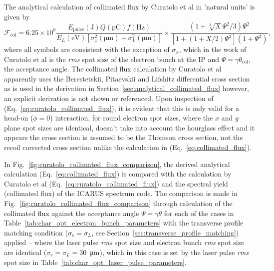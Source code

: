 \documentclass[../main.tex]{subfiles}
\begin{document}
The analytical calculation of collimated flux by Curatolo et al \cite{curatolo2017analytical} in 'natural units' is given by  
\begin{equation}
\mathcal{F}_{\mathrm{col}} = 6.25\times 10^{8}\frac{E_{\mathrm{pulse}}\left(\mathrm{\si{\joule}}\right)Q\left(\si{\pico\coulomb}\right)f\left(\si{\hertz}\right)}{E_{L}\left(\si{\electronvolt}\right)\left[\sigma_{x}^{2}\left(\si{\micro\meter}\right)+\sigma_{L}^{2}\left(\si{\micro\meter}\right)\right]}\times\frac{\left(1+\sqrt[3]{X}\Psi^{2}/3\right)\Psi^{2}}{\left[1+\left(1+X/2\right)\Psi^{2}\right]\left(1+\Psi^{2}\right)},
\label{eq:curatolo_collimated_flux}
\end{equation}
where all symbols are consistent with the exception of $\sigma_{x}$, which in the work of Curatolo et al is the \textit{rms} spot size of the electron bunch at the IP and $\Psi = \gamma\theta_{\mathrm{col}}$, the acceptance angle. The collimated flux calculation by Curatolo et al \cite{curatolo2017analytical} apparently uses the Berestetskii, Pitaevskii and Lifshitz \cite{berestetskii1982quantum} differential cross section as is used in the derivation in Section~\ref{sec:analytical_collimated_flux} however, an explicit derivation is not shown or referenced. Upon inspection of (Eq.~\ref{eq:curatolo_collimated_flux}), it is evident that this is only valid for a head-on ($\phi=0$) interaction, for round electron spot sizes, where the $x$ and $y$ plane spot sizes are identical, doesn't take into account the hourglass effect \cite{furman1991hourglass,miyahara2008luminosity} and it appears the cross section is assumed to be the Thomson cross section, not the recoil corrected cross section unlike the calculation in (Eq.~\ref{eq:collimated_flux}).   

In Fig.~\ref{fig:curatolo_collimated_flux_comparison}, the derived analytical calculation (Eq.~\ref{eq:collimated_flux}) is compared with the calculation by Curatolo et al \cite{curatolo2017analytical} (Eq.~\ref{eq:curatolo_collimated_flux}) and the spectral yield (collimated flux) of the \textsc{ICARUS} spectrum code. The comparison is made in Fig.~\ref{fig:curatolo_collimated_flux_comparison} through calculation of the collimated flux against the acceptance angle $\Psi = \gamma\theta$ for each of the cases in Table~\ref{tab:char_opt_electron_bunch_parameters} with the transverse profile matching condition ($\sigma_{e} = \sigma_{L}$, see Section~\ref{sec:transverse_profile_matching}) applied -- where the laser pulse \textit{rms} spot size and electron bunch \textit{rms} spot size are identical ($\sigma_{e} = \sigma_{L} = 30$~\si{\micro\meter}), which in this case is set by the laser pulse \textit{rms} spot size in Table~\ref{tab:char_opt_laser_pulse_parameters}.    
\end{document}

